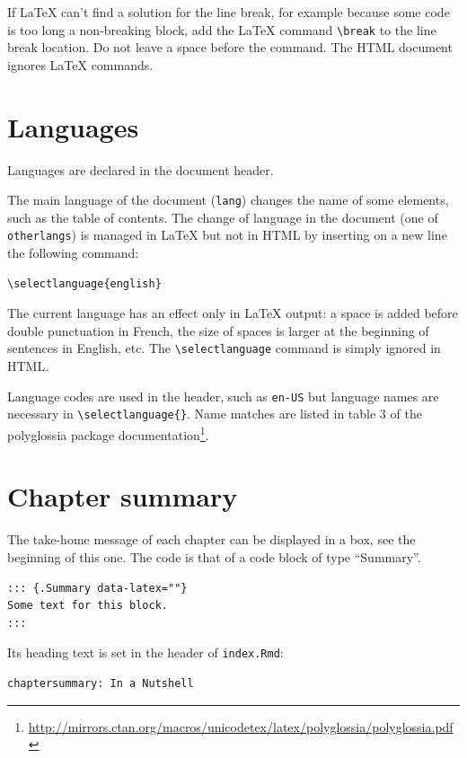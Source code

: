 \documentclass[
  12pt,
  american,
  a4paper,
  extrafontsizes,onecolumn,openright
  ]{memoir}
\begin{document}
If LaTeX can't find a solution for the line break, for example because some code is too long a non-breaking block, add the LaTeX command \texttt{\textbackslash{}break} to the line break location.
Do not leave a space before the command.
The HTML document ignores LaTeX commands.

\section{Languages}\label{sec:languages}

Languages are declared in the document header.

The main language of the document (\texttt{lang}) changes the name of some elements, such as the table of contents.
The change of language in the document (one of \texttt{otherlangs}) is managed in LaTeX but not in HTML by inserting on a new line the following command:

\begin{verbatim}
\selectlanguage{english}
\end{verbatim}

The current language has an effect only in LaTeX output: a space is added before double punctuation in French, the size of spaces is larger at the beginning of sentences in English, etc.
The \texttt{\textbackslash{}selectlanguage} command is simply ignored in HTML.

Language codes are used in the header, such as \texttt{en-US} but language names are necessary in \texttt{\textbackslash{}selectlanguage\{\}}.
Name matches are listed in table 3 of the polyglossia package documentation\footnote{\url{http://mirrors.ctan.org/macros/unicodetex/latex/polyglossia/polyglossia.pdf}}.

\section{Chapter summary}\label{chapter-summary}

The take-home message of each chapter can be displayed in a box, see the beginning of this one.
The code is that of a code block of type \enquote{Summary}.

\begin{verbatim}
::: {.Summary data-latex=""}
Some text for this block.
:::
\end{verbatim}

Its heading text is set in the header of \texttt{index.Rmd}:

\begin{verbatim}
chaptersummary: In a Nutshell
\end{verbatim}
\end{document}
